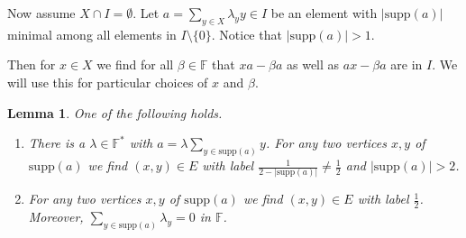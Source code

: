 \documentclass[oneside,a4paper]{amsart} %
\newtheorem{lemma}[proposition]{Lemma}
\theoremstyle{definition}
\begin{document}
Now assume $X\cap I=\emptyset$. 
Let $a=\displaystyle\sum_{y\in X}\lambda_y y\in I$ be an element with $|\mathrm{supp}(a)|$ minimal among all elements in $I\setminus \{0\}$.
Notice that $|\mathrm{supp}(a)|>1$.




Then for $x\in X$ we find for all $\beta\in \mathbb{F}$ that $xa-\beta a$ as well as $ax-\beta a$ are in $I$.
We will use this for particular choices of $x$ and  $\beta$.

\begin{lemma}\label{casesfora}
One of the following holds.
\begin{enumerate}
\item 
There is a $\lambda\in \mathbb{F}^*$ with $a=\lambda\displaystyle \sum_{y\in \mathrm{supp}(a)} y$.
For any two vertices $x,y$ of $\mathrm{supp}(a)$ we find $(x,y)\in E$ with label $\frac{1}{2-|\mathrm{supp}(a)|}\neq \frac{1}{2}$ and $|\mathrm{supp}(a)|>2$.
\item

For any two vertices $x,y$ of $\mathrm{supp}(a)$ we find $(x,y)\in E$ with label $\frac{1}{2}$.
Moreover, $\displaystyle\sum_{y\in \mathrm{supp}(a)} \lambda_y=0$ in $\mathbb{F}$.
\end{enumerate}
\end{lemma}
\end{document}

